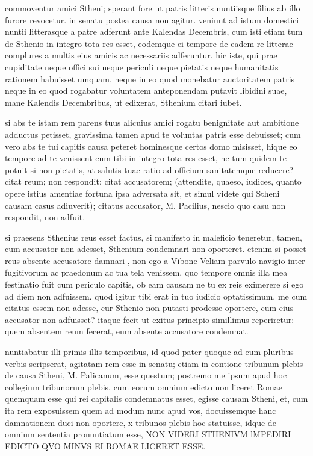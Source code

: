  commoventur amici Stheni; sperant fore ut patris litteris nuntiisque filius ab illo furore revocetur. in senatu postea causa non agitur. veniunt ad istum domestici nuntii litterasque a patre adferunt ante Kalendas Decembris, cum isti etiam tum de Sthenio in integro tota res esset, eodemque ei tempore de eadem re litterae complures a multis eius amicis ac necessariis adferuntur. hic iste, qui prae cupiditate neque offici sui neque periculi neque pietatis neque humanitatis rationem habuisset umquam, neque in eo quod monebatur auctoritatem patris neque in eo quod rogabatur voluntatem anteponendam putavit libidini suae, mane Kalendis Decembribus, ut edixerat, Sthenium citari iubet.

 si abs te istam rem parens tuus alicuius amici rogatu benignitate aut ambitione adductus petisset, gravissima tamen apud te voluntas patris esse debuisset; cum vero abs te tui capitis causa peteret hominesque certos domo misisset, hique eo tempore ad te venissent cum tibi in integro tota res esset, ne tum quidem te potuit si non pietatis, at salutis tuae ratio ad officium sanitatemque reducere? citat reum; non respondit; citat accusatorem; (attendite, quaeso, iudices, quanto opere istius amentiae fortuna ipsa adversata sit, et simul videte qui Stheni causam casus adiuverit); citatus accusator, M. Pacilius, nescio quo casu non respondit, non adfuit.

 si praesens Sthenius reus esset factus, si manifesto in maleficio teneretur, tamen, cum accusator non adesset, Sthenium condemnari non oporteret. etenim si posset reus absente accusatore damnari , non ego a Vibone Veliam parvulo navigio inter fugitivorum ac praedonum ac tua tela venissem, quo tempore omnis illa mea festinatio fuit cum periculo capitis, ob eam causam ne tu ex reis eximerere si ego ad diem non adfuissem. quod igitur tibi erat in tuo iudicio optatissimum, me cum citatus essem non adesse, cur Sthenio non putasti prodesse oportere, cum eius accusator non adfuisset? itaque fecit ut exitus principio simillimus reperiretur: quem absentem reum fecerat, eum absente accusatore condemnat.

 nuntiabatur illi primis illis temporibus, id quod pater quoque ad eum pluribus verbis scripserat, agitatam rem esse in senatu; etiam in contione tribunum plebis de causa Stheni, M. Palicanum, esse questum; postremo me ipsum apud hoc collegium tribunorum plebis, cum eorum omnium edicto non liceret Romae quemquam esse qui rei capitalis condemnatus esset, egisse causam Stheni, et, cum ita rem exposuissem quem ad modum nunc apud vos, docuissemque hanc damnationem duci non oportere, x tribunos plebis hoc statuisse, idque de omnium sententia pronuntiatum esse, NON VIDERI STHENIVM lMPEDIRI EDICTO QVO MINVS EI ROMAE LICERET ESSE.

